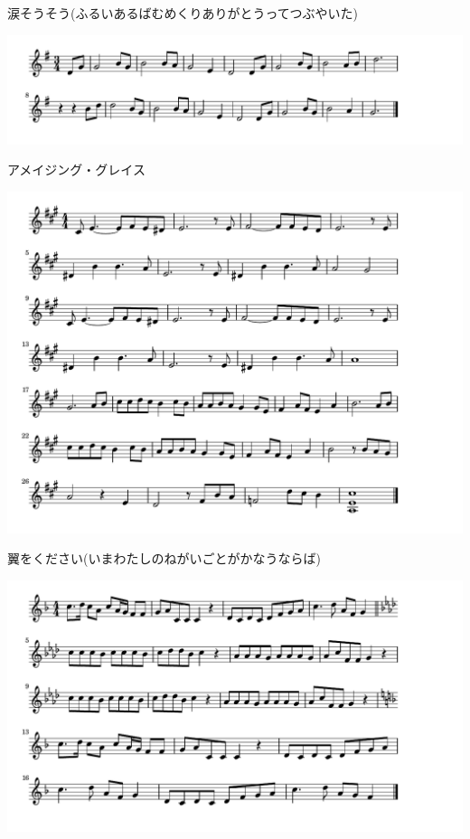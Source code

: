 \documentclass[a4paper]{ltjsarticle}
\begin{document}
\vspace{-10mm} \hspace{10mm}
涙そうそう(ふるいあるばむめくりありがとうってつぶやいた)

\includegraphics[clip]{amazinggrace_crop.pdf}

\vspace{-10mm} \hspace{10mm}
アメイジング・グレイス

\includegraphics[clip]{tsubasa_crop.pdf}

\vspace{-10mm} \hspace{10mm}
翼をください(いまわたしのねがいごとがかなうならば)

\includegraphics[clip]{aoimewoshita_crop.pdf}
\end{document}
